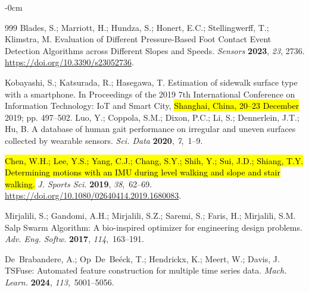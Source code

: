 \documentclass[sensors,article,accept,pdftex,moreauthors]{Definitions/mdpi}
\begin{document}
\begin{adjustwidth}{-\extralength}{0cm}
\begin{thebibliography}{999}
Blades, S.; Marriott, H.; Hundza, S.; Honert, E.C.; Stellingwerff, T.;
  Klimstra, M.
 Evaluation of Different Pressure-Based Foot Contact Event Detection
  Algorithms across Different Slopes and Speeds.
 {\em Sensors} {\bf 2023}, {\em 23}, 2736.
 {\url{https://doi.org/10.3390/s23052736}}.

Kobayashi, S.; Katsurada, R.; Hasegawa, T.
 Estimation of sidewalk surface type with a smartphone.
 In Proceedings of the 2019 7th International
  Conference on Information Technology: IoT and Smart City, \hl{Shanghai, China,  20--23 December} 2019; pp. 497--502.
Luo, Y.; Coppola, S.M.; Dixon, P.C.; Li, S.; Dennerlein, J.T.; Hu, B.
 A database of human gait performance on irregular and uneven surfaces
  collected by wearable sensors.
 {\em Sci. Data} {\bf 2020}, {\em 7},~1--9.

\hl{Chen, W.H.; Lee, Y.S.; Yang, C.J.; Chang, S.Y.; Shih, Y.; Sui, J.D.; Shiang, T.Y.}
 \hl{Determining motions with an IMU during level walking and slope and
  stair walking.} %
 {\em J.  Sports Sci.} {\bf 2019}, {\em 38},~62--69.
 {\url{https://doi.org/10.1080/02640414.2019.1680083}}.

Mirjalili, S.; Gandomi, A.H.; Mirjalili, S.Z.; Saremi, S.; Faris, H.;
  Mirjalili, S.M.
 Salp Swarm Algorithm: A bio-inspired optimizer for engineering design
  problems.
 {\em Adv. Eng. Softw.} {\bf 2017}, {\em 114},~163--191.

De~Brabandere, A.; Op~De~Be{\'e}ck, T.; Hendrickx, K.; Meert, W.; Davis, J.
 TSFuse: Automated feature construction for multiple time series data.
 {\em Mach. Learn.} {\bf 2024}, {\em 113},~5001--5056.



\end{thebibliography}
\end{adjustwidth}
\end{document}
